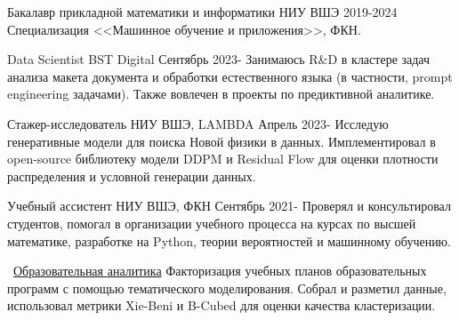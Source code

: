 \documentclass[11pt]{spidercv}
\begin{document}
    





    \begin{MainPart}

    \Experience
        {\ColorHighlight}
		{\Large{Бакалавр прикладной математики и информатики}}
		{НИУ ВШЭ}
        {2019-2024}
        {   
            Специализация <<Машинное обучение и приложения>>, ФКН.\\
        }

    \Experience
        {\ColorHighlight}
		{\Large{Data Scientist}}
		{BST Digital}
            {Сентябрь 2023-\faUndo}
        {   
            Занимаюсь R\&D в кластере задач анализа макета документа и обработки естественного языка (в частности, prompt engineering задачами). Также вовлечен в проекты по предиктивной аналитике.
        }
    
    \Experience
        {\ColorHighlight}
		{\Large{Стажер-исследователь}}
		{НИУ ВШЭ, LAMBDA}
            {Апрель 2023-\faUndo}
        {   
            Исследую генеративные модели для поиска Новой физики в данных. Имплементировал в open-source библиотеку модели DDPM и Residual Flow для оценки плотности распределения и условной генерации данных.
        }

    \Experience
        {\ColorHighlight}
		{\Large{Учебный ассистент}}
		{НИУ ВШЭ, ФКН}
            {Сентябрь 2021-\faUndo}
        {   
            Проверял и консультировал студентов, помогал в организации учебного процесса на курсах по высшей математике, разработке на Python, теории вероятностей и машинному обучению.
        }

    \Experience
        {\ColorHighlight}
		{\Large\faGithub\ \href{https://github.com/necroshine0/edu-analytics}{Образовательная аналитика}}
            {}{}
        {   
            Факторизация учебных планов образовательных программ с помощью тематического моделирования. Собрал и разметил данные, использовал метрики Xie-Beni и B-Cubed для оценки качества кластеризации.\\
        }


\end{MainPart}
\end{document}
